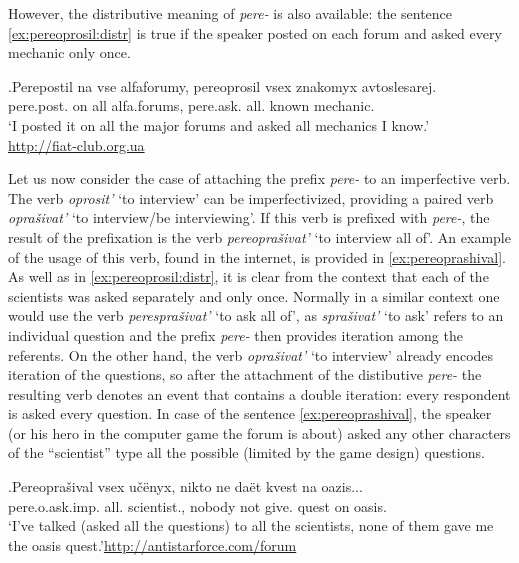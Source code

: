 However, the distributive meaning of \textit{pere-} is also available: the sentence \ref{ex:pereoprosil:distr} is true if the speaker posted on each forum and asked every mechanic only once.

\exg.\label{ex:pereoprosil:distr}Perepostil na vse alfaforumy, pereoprosil vsex znakomyx avtoslesarej.\\ 
pere.post. on all {alfa.forums}, pere.ask. all. known mechanic.\\
\trans `I posted it on all the major forums and asked all mechanics I know.'\\\hbox{}\hfill\hbox{\url{http://fiat-club.org.ua}}

Let us now consider the case of attaching the prefix \textit{pere-} to an imperfective verb. The verb \textit{oprosit'}\textsuperscript{\PF} `to interview' can be imperfectivized, providing a paired verb \textit{opra\v{s}ivat'}\textsuperscript{\IPF} `to interview/be interviewing'. If this verb is prefixed with \textit{pere-}, the result of the prefixation is the verb \textit{pereopra\v{s}ivat'}\textsuperscript{\PF} `to interview all of'. An example of the usage of this verb, found in the internet, is provided in \ref{ex:pereoprashival}. As well as in \ref{ex:pereoprosil:distr}, it is clear from the context that each of the scientists was asked separately and only once. Normally in a similar context one would use the verb \textit{perespra\v{s}ivat'}\textsuperscript{\PF} `to ask all of', as \textit{spra\v{s}ivat'}\textsuperscript{\PF} `to ask' refers to an individual question and the prefix \textit{pere-} then provides iteration among the referents. On the other hand, the verb \textit{opra\v{s}ivat'}\textsuperscript{\PF} `to interview' already encodes iteration of the questions, so after the attachment of the distibutive \textit{pere-} the resulting verb denotes an event that contains a double iteration: every respondent is asked every question. In case of the sentence \ref{ex:pereoprashival}, the speaker (or his hero in the computer game the forum is about) asked any other characters of the ``scientist'' type all the possible (limited by the game design) questions.

\exg.\label{ex:pereoprashival}Pereopra\v{s}ival vsex u\v{c}\"{e}nyx, nikto ne da\"{e}t kvest na oazis...\\
pere.o.ask.imp. all. scientist., nobody not give. quest on oasis.\\
\trans `I've talked (asked all the questions) to all the scientists, none of them gave me the oasis quest.'\hbox{}\hfill\hbox{\url{http://antistarforce.com/forum}}


